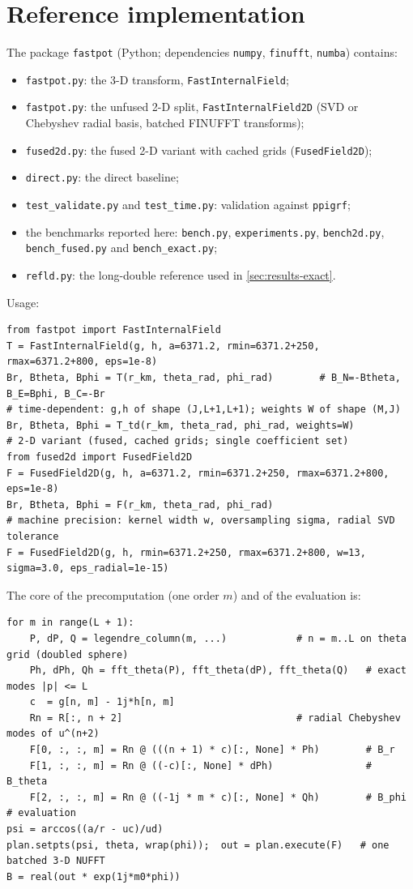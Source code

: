 \documentclass[11pt,a4paper]{article}
\theoremstyle{remark}
\begin{document}
\section{Reference implementation}\label{sec:impl}
The package \texttt{fastpot} (Python; dependencies \texttt{numpy}, \texttt{finufft}, \texttt{numba}) contains:
\begin{itemize}
\item \texttt{fastpot.py}: the 3-D transform, \texttt{FastInternalField};
\item \texttt{fastpot.py}: the unfused 2-D split, \texttt{FastInternalField2D} (SVD or Chebyshev radial
  basis, batched FINUFFT transforms);
\item \texttt{fused2d.py}: the fused 2-D variant with cached grids (\texttt{FusedField2D});
\item \texttt{direct.py}: the direct baseline;
\item \texttt{test\_validate.py} and \texttt{test\_time.py}: validation against \texttt{ppigrf};
\item the benchmarks reported here: \texttt{bench.py}, \texttt{experiments.py}, \texttt{bench2d.py},
  \texttt{bench\_fused.py} and \texttt{bench\_exact.py};
\item \texttt{refld.py}: the long-double reference used in \cref{sec:results-exact}.
\end{itemize}
Usage:
\begin{lstlisting}
from fastpot import FastInternalField
T = FastInternalField(g, h, a=6371.2, rmin=6371.2+250, rmax=6371.2+800, eps=1e-8)
Br, Btheta, Bphi = T(r_km, theta_rad, phi_rad)        # B_N=-Btheta, B_E=Bphi, B_C=-Br
# time-dependent: g,h of shape (J,L+1,L+1); weights W of shape (M,J)
Br, Btheta, Bphi = T_td(r_km, theta_rad, phi_rad, weights=W)
# 2-D variant (fused, cached grids; single coefficient set)
from fused2d import FusedField2D
F = FusedField2D(g, h, a=6371.2, rmin=6371.2+250, rmax=6371.2+800, eps=1e-8)
Br, Btheta, Bphi = F(r_km, theta_rad, phi_rad)
# machine precision: kernel width w, oversampling sigma, radial SVD tolerance
F = FusedField2D(g, h, rmin=6371.2+250, rmax=6371.2+800, w=13, sigma=3.0, eps_radial=1e-15)
\end{lstlisting}
The core of the precomputation (one order $m$) and of the evaluation is:
\begin{lstlisting}
for m in range(L + 1):
    P, dP, Q = legendre_column(m, ...)            # n = m..L on theta grid (doubled sphere)
    Ph, dPh, Qh = fft_theta(P), fft_theta(dP), fft_theta(Q)   # exact modes |p| <= L
    c  = g[n, m] - 1j*h[n, m]
    Rn = R[:, n + 2]                              # radial Chebyshev modes of u^(n+2)
    F[0, :, :, m] = Rn @ (((n + 1) * c)[:, None] * Ph)        # B_r
    F[1, :, :, m] = Rn @ ((-c)[:, None] * dPh)                # B_theta
    F[2, :, :, m] = Rn @ ((-1j * m * c)[:, None] * Qh)        # B_phi
# evaluation
psi = arccos((a/r - uc)/ud)
plan.setpts(psi, theta, wrap(phi));  out = plan.execute(F)   # one batched 3-D NUFFT
B = real(out * exp(1j*m0*phi))
\end{lstlisting}
\end{document}
